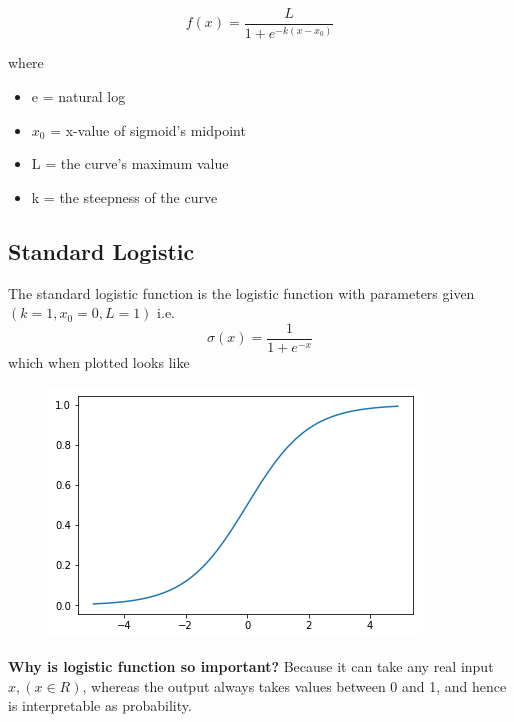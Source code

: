 \documentclass[10pt,a4paper]{article}
\begin{document}
	\begin{equation}
			f(x) = \frac{L}{1 + e^{-k(x-x_0)}}
	\end{equation}

	
	where
	\begin{itemize}
		\item e = natural log
		\item $x_0$ = x-value of sigmoid's midpoint
		\item L = the curve's maximum value
		\item k = the steepness of the curve
	\end{itemize}

	\subsection{Standard Logistic}
	
	The standard logistic function is the logistic function with parameters given $(k = 1, x_0 = 0, L = 1)$
	i.e.\\
	\begin{equation}
		\sigma(x) = \frac{1}{1 + e^{-x}}
	\end{equation}
	which when plotted looks like\\
	\begin{figure}[h]
		\includegraphics[scale=0.65]{sigmoidplot}
		\centering
	\end{figure}

	\textbf{Why is logistic function so important?}
	Because it can take any real input $x, (x \in R)$, whereas the output always takes values between 0 and 1, and hence is interpretable as probability.
	

	
\end{document}
